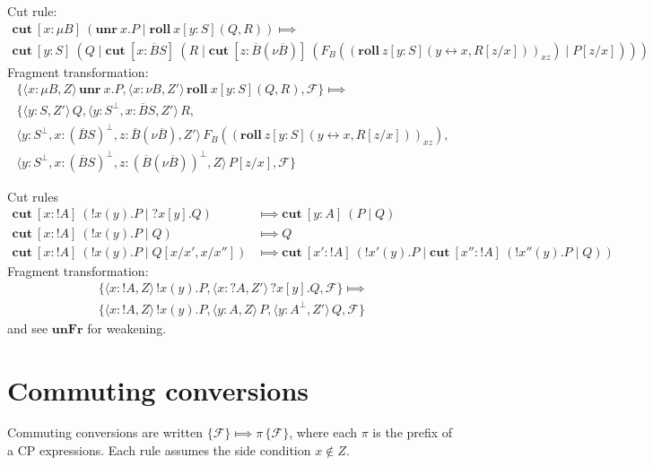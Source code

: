 \documentclass{article}
\newcommand{\cut}[4]{\mathbf{cut}\: [#1:#2] \: (#3 \mid #4)}
\newcommand{\unroll}[2]{\mathbf{unr}\:#1.#2}
\newcommand{\roll}[5]{\mathbf{roll}\:#1 [#2:#3] (#4,#5)}
\newcommand{\fragment}[2]{\langle #1 \rangle \, #2}
\def\link{\leftrightarrow}
\def\goesto{\Longmapsto}
\def\F{\mathcal{F}}
\def\unFr{\mathbf{unFr}}
\begin{document}
\noindent
Cut rule:
\begin{multline*}
 \cut{x}{\mu B}{\unroll{x}{P}}{\roll{x}{y}{S}{Q}{R}} \goesto \\
 \cut{y}{S}{Q}{\cut{x}{\overline{B}S}{R}{\cut{z}{\overline{B}(\nu \overline{B})}{F_B((\roll{z}{y}{S}{y \link x}{R[z/x]})_{xz})}{P[z/x]}}}
\end{multline*}
Fragment transformation:
\begin{multline*}
  \{\fragment{x:\mu B,Z}{\unroll{x}{P}}, \fragment{x:\nu B,Z'}{\roll{x}{y}{S}{Q}{R}}, \F \} \goesto \\
  \{\fragment{y:S,Z'}{Q}, \fragment{y:S^\perp,x:\overline{B}S,Z'}{R},\\
    \fragment{y:S^\perp,x:(\overline{B}S)^\perp,z:\overline{B}(\nu \overline{B}),Z'}{F_B((\roll{z}{y}{S}{y \link x}{R[z/x]})_{xz})}, \\
    \fragment{y:S^\perp,x:(\overline{B}S)^\perp,z:(\overline{B}(\nu \overline{B}))^\perp,Z}{P[z/x]}, \F \}
\end{multline*}

\noindent
Cut rules
\begin{align*}
  \cut{x}{{!A}}{!x(y).P}{?x[y].Q} &\goesto \cut{y}{A}{P}{Q} \\
  \cut{x}{{!A}}{!x(y).P}{Q} &\goesto Q \\
  \cut{x}{{!A}}{!x(y).P}{Q[x/x',x/x'']} &\goesto \cut{x'}{{!A}}{!x'(y).P}{\cut{x''}{{!A}}{!x''(y).P}{Q}}
\end{align*}
Fragment transformation:
\begin{multline*}
  \{\fragment{x:{!A},Z}{!x(y).P}, \fragment{x:{?A},Z'}{?x[y].Q}, \F \} \goesto \\
  \{\fragment{x:{!A},Z}{!x(y).P}, \fragment{y:A,Z}{P}, \fragment{y:A^\perp,Z'}{Q}, \F \}
\end{multline*}
and see $\unFr$ for weakening.


\section{Commuting conversions}

Commuting conversions are written $\{ \F \} \goesto \pi\,\{\F\}$, where each $\pi$ is the prefix
of a CP expressions.  Each rule assumes the side condition $x \notin Z$.
\end{document}
